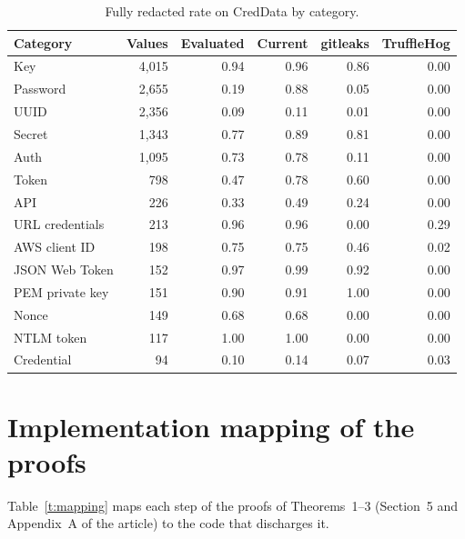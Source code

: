 \documentclass[11pt,a4paper]{article}
\begin{document}
\begin{table}[ht]
\caption{Fully redacted rate on CredData by category.}\label{t:cred}
\small
\begin{tabular*}{\textwidth}{@{\extracolsep\fill}lrrrrr}
\toprule
Category & Values & Evaluated & Current & gitleaks & TruffleHog \\
\midrule
Key & 4,015 & 0.94 & 0.96 & 0.86 & 0.00 \\
Password & 2,655 & 0.19 & 0.88 & 0.05 & 0.00 \\
UUID & 2,356 & 0.09 & 0.11 & 0.01 & 0.00 \\
Secret & 1,343 & 0.77 & 0.89 & 0.81 & 0.00 \\
Auth & 1,095 & 0.73 & 0.78 & 0.11 & 0.00 \\
Token & 798 & 0.47 & 0.78 & 0.60 & 0.00 \\
API & 226 & 0.33 & 0.49 & 0.24 & 0.00 \\
URL credentials & 213 & 0.96 & 0.96 & 0.00 & 0.29 \\
AWS client ID & 198 & 0.75 & 0.75 & 0.46 & 0.02 \\
JSON Web Token & 152 & 0.97 & 0.99 & 0.92 & 0.00 \\
PEM private key & 151 & 0.90 & 0.91 & 1.00 & 0.00 \\
Nonce & 149 & 0.68 & 0.68 & 0.00 & 0.00 \\
NTLM token & 117 & 1.00 & 1.00 & 0.00 & 0.00 \\
Credential & 94 & 0.10 & 0.14 & 0.07 & 0.03 \\
\bottomrule
\end{tabular*}
\end{table}

\section{Implementation mapping of the proofs}\label{s:mapping}

Table~\ref{t:mapping} maps each step of the proofs of Theorems~1--3 (Section~5 and Appendix~A of the article) to the code that discharges it.
\end{document}
